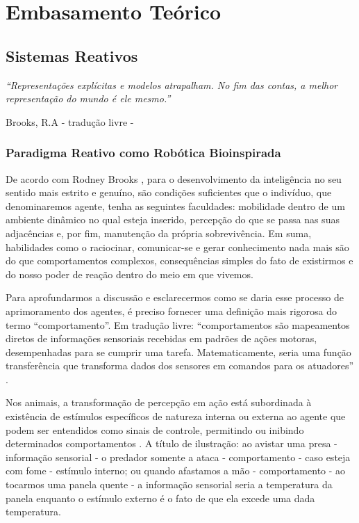 \chapter[Embasamento Teórico]{Embasamento Teórico}
\section{Sistemas Reativos}
\epigraph{ 
	  \textit{``Representações explícitas e modelos atrapalham. No fim das contas, a melhor representação do mundo é ele mesmo.''} 
	 }
	  { Brooks, R.A \cite{brooks} - tradução livre -} 
	  

\subsection{Paradigma Reativo como Robótica Bioinspirada} 

De acordo com Rodney Brooks \cite{brooks}, para o desenvolvimento da inteligência no seu sentido mais estrito e genuíno, são condições 
suficientes que o indivíduo, que denominaremos agente, tenha as seguintes faculdades: mobilidade dentro de um ambiente dinâmico no qual esteja 
inserido, percepção do que se passa nas suas adjacências e, por fim, manutenção da própria sobrevivência.
Em suma, habilidades como o raciocinar, comunicar-se e gerar conhecimento nada mais são do que comportamentos complexos, consequências simples do 
fato 
de existirmos e do nosso poder de reação dentro do meio em que vivemos.

Para aprofundarmos a discussão e esclarecermos como se daria esse processo de aprimoramento dos agentes, é preciso fornecer uma  definição 
mais rigorosa do termo ``comportamento''.
Em tradução livre: ``comportamentos são mapeamentos diretos de informações sensoriais recebidas em  
padrões de ações motoras, desempenhadas para se cumprir uma tarefa. Matematicamente, seria uma função transferência que transforma dados dos 
sensores em comandos para os atuadores'' \cite{murphy}.

Nos animais, a transformação de percepção em ação está subordinada à existência de estímulos específicos de natureza interna ou externa 
ao agente que podem ser entendidos como sinais de controle, permitindo ou inibindo determinados comportamentos \cite{murphy}.
A título de ilustração: ao avistar uma presa - informação sensorial - o predador somente a ataca - comportamento - caso esteja com fome - estímulo 
interno; ou quando afastamos a mão - comportamento - ao tocarmos uma panela quente - a informação sensorial seria a temperatura da panela enquanto o 
estímulo externo é o fato de que ela excede uma dada temperatura.

